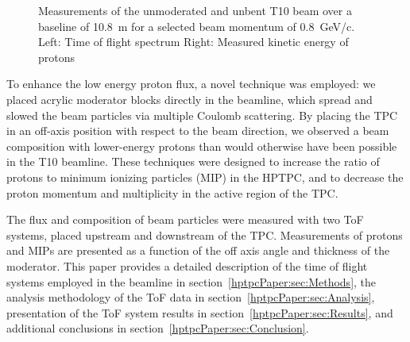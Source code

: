 \begin{figure}
  \begin{minipage}[t]{0.49\textwidth}
    \centering
    \begin{adjustbox}{max totalsize={\textwidth},center}
      
    \end{adjustbox}
  \end{minipage}
  \hfill
  \begin{minipage}[t]{0.49\textwidth}
    \centering
    \begin{adjustbox}{max totalsize={\textwidth},center}
      
    \end{adjustbox}
  \end{minipage}
  \caption{\label{fig:utofNoBend}Measurements of the unmoderated and unbent T10 beam over a baseline of 10.8~m for a selected beam momentum of 0.8~GeV/c. Left: Time of flight spectrum Right: Measured kinetic energy of protons}
\end{figure}

To enhance the low energy proton flux, a novel technique was employed:
we placed acrylic moderator blocks directly in the beamline, which spread and slowed the beam particles via multiple Coulomb scattering.
By placing the TPC in an off-axis position with respect to the beam direction, we observed a beam composition with lower-energy protons than would otherwise have been possible in the T10 beamline.
These techniques were designed to increase the ratio of protons to minimum ionizing particles (MIP) in the HPTPC, and to decrease the proton momentum and multiplicity in the active region of the TPC.

The flux and composition of beam particles were measured with two ToF systems, placed upstream and downstream of the TPC.
Measurements of protons and MIPs are presented as a function of the off axis angle and thickness of the moderator.
This paper provides a detailed description of the time of flight systems employed in the beamline in section~\ref{hptpcPaper:sec:Methods}, the analysis methodology of the ToF data in section~\ref{hptpcPaper:sec:Analysis}, presentation of the ToF system results in section~\ref{hptpcPaper:sec:Results}, and additional conclusions in section~\ref{hptpcPaper:sec:Conclusion}.

